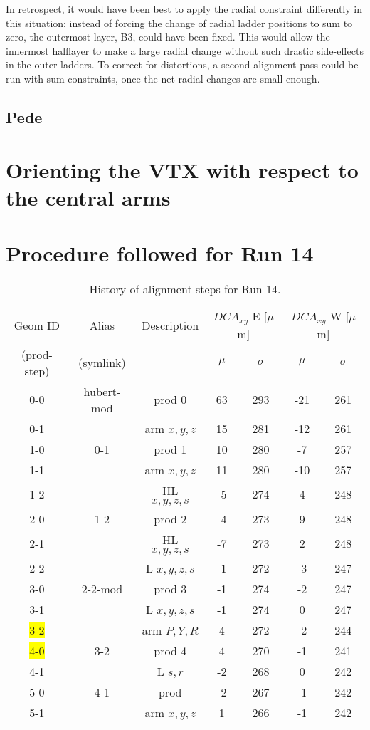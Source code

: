 \documentclass[12pt]{article}
\begin{document}
In retrospect, it would have been best to apply the radial constraint differently in this situation: instead of forcing the change of radial ladder positions to sum to zero, the outermost layer, B3, could have been fixed. This would allow the innermost halflayer to make a large radial change without such drastic side-effects in the outer ladders. To correct for distortions, a second alignment pass could be run with sum constraints, once the net radial changes are small enough.



\subsection{Pede}
\section{Orienting the VTX with respect to the central arms}
\section{Procedure followed for Run 14}
\begin{table}[htb!]
\centering
\begin{tabular}{c | c | c | c | c | c | c}
Geom ID & Alias & Description & \multicolumn{2}{c}{$DCA_{xy}$ E [$\mu$m]} 
                              & \multicolumn{2}{|c}{$DCA_{xy}$ W [$\mu$m]} \\
(prod-step) & (symlink) &     & $\mu$ & $\sigma$ & $\mu$ & $\sigma$\\
\hline
0-0 & hubert-mod & prod 0    & 63 & 293 & -21 & 261 \\
0-1 & & arm $x,y,z$          & 15 & 281 & -12 & 261 \\
1-0 & 0-1 & prod 1           & 10 & 280 &  -7 & 257 \\
1-1 & & arm $x,y,z$          & 11 & 280 & -10 & 257 \\
1-2 & & HL $x,y,z,s$         & -5 & 274 &   4 & 248 \\
2-0 & 1-2 & prod 2           & -4 & 273 &   9 & 248 \\
2-1 & & HL $x,y,z,s$         & -7 & 273 &   2 & 248 \\
2-2 & & L $x,y,z,s$          & -1 & 272 &  -3 & 247 \\
3-0 & 2-2-mod & prod 3       & -1 & 274 &  -2 & 247 \\
3-1 & & L $x,y,z,s$          & -1 & 274 &   0 & 247 \\
\colorbox{yellow}{3-2} & & arm $P,Y,R$          &  4 & 272 &  -2 & 244 \\
\colorbox{yellow}{4-0} & 3-2 & prod 4           &  4 & 270 &  -1 & 241 \\
4-1 & & L $s,r$              & -2 & 268 &   0 & 242 \\
5-0 & 4-1 & prod             & -2 & 267 &  -1 & 242 \\
5-1 & & arm $x,y,z$          &  1 & 266 &  -1 & 242 \\
\hline
\end{tabular}
\caption{History of alignment steps for Run 14.}
\label{tab:history}
\end{table}
\end{document}
